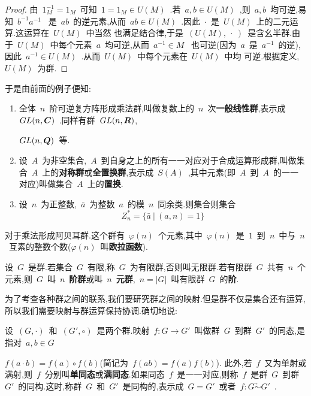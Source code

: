 \begin{proof}
    由~$1_M^{-1}=1_{M}$~可知~$1=1_M \in U(M)$~.若~$a,b \in U(M)$~,则~$a,b$~均可逆,易知~$b^{-1}a^{-1}$~
    是~$ab$~的逆元素,从而~$ab \in U(M)$~.因此~$\cdot$~是~$U(M)$~上的二元运算.这运算在~$U(M)$~中当然
    也满足结合律,于是~$(U(M),~\cdot~)$~是含幺半群.由于~$U(M)$~中每个元素~$a$~均可逆,从而~$a^{-1} \in M$~
    也可逆(因为~$a$~是~$a^{-1}$~的逆),因此~$a^{-1} \in U(M)$~.从而~$U(M)$~中每个元素在~$U(M)$~中均
    可逆.根据定义,~$U(M)$~为群.
\end{proof}
于是由前面的例子便知:\par
\begin{enumerate}
    \item 全体~$n$~阶可逆复方阵形成乘法群,叫做复数上的~$n$~次\textbf{一般线性群},表示成~$GL(n,\boldsymbol{C})$~.同样有群~$GL(n,\boldsymbol{R})$,\par
    $GL(n,\boldsymbol{Q})$~等.
    \item 设~$A$~为非空集合,~$A$~到自身之上的所有一一对应对于合成运算形成群,叫做集合~$A$~上的\textbf{对称群}或\textbf{全置换群},表示成~$S(A)$~,其中元素(即~$A$~到~$A$~的一一对应)叫做集合~$A$~上的\textbf{置换}.
    \item 设~$n$~为正整数,~$\bar{a}$~为整数~$a$~的模~$n$~同余类.则集合则集合
    \begin{equation*}
        Z^*_n = \{\bar{a}~|~(a,n)=1\}
    \end{equation*}
\end{enumerate}
对于乘法形成阿贝耳群.这个群有~$\varphi(n)$~个元素,其中~$\varphi(n)$~是~$1$~到~$n$~中与~$n$~互素的整数个数($\varphi(n)$~叫\textbf{欧拉函数}).\par
设~$G$~是群.若集合~$G$~有限,称~$G$~为有限群,否则叫无限群.若有限群~$G$~共有~$n$~个元素,则~$G$~叫~$n$~\textbf{阶群}或叫~$n$~\textbf{元群},~$n=|G|$~叫有限群~$G$~的\textbf{阶}.\par
为了考查各种群之间的联系,我们要研究群之间的映射.但是群不仅是集合还有运算,所以我们需要映射与群运算保持协调.确切地说:
\begin{Definition}
    设~$(G,\cdot)$~和~$(G',\circ)$~是两个群.映射~$f:G \to G'$~叫做群~$G$~到群~$G'$~的同态,是指对~$a,b\in G$~
\end{Definition}
$f(a \cdot b) = f(a) \circ f(b)$(简记为~$f(ab)=f(a)f(b)$).
此外,若~$f$~又为单射或满射,则~$f$~分别叫\textbf{单同态}或\textbf{满同态}.如果同态~$f$~是一一对应,则称~$f$~是群~$G$~到群~$G'$~的同构.这时,称群~$G$~和~$G'$~是同构的,表示成~$G=G'$~或者~$f:G\underrightarrow{\sim}G'$~.

